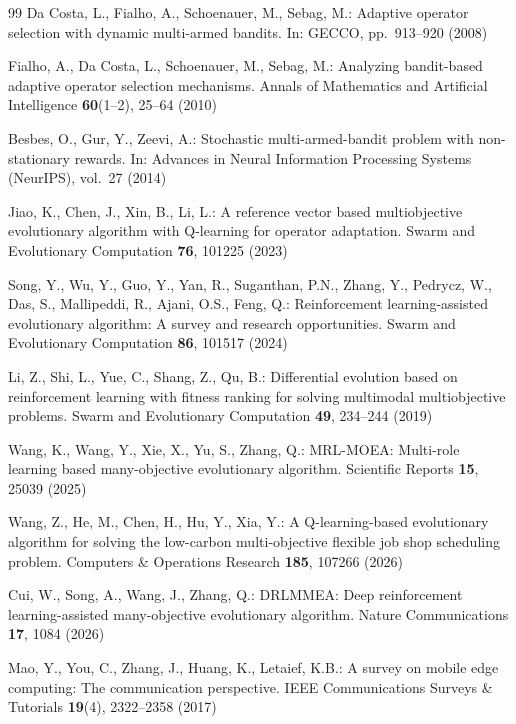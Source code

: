 \documentclass[runningheads]{llncs}
\begin{document}
\begin{thebibliography}{99}
Da Costa, L., Fialho, A., Schoenauer, M., Sebag, M.: Adaptive operator selection with dynamic multi-armed bandits. In: GECCO, pp.~913--920 (2008)

Fialho, A., Da Costa, L., Schoenauer, M., Sebag, M.: Analyzing bandit-based adaptive operator selection mechanisms. Annals of Mathematics and Artificial Intelligence \textbf{60}(1--2), 25--64 (2010)

Besbes, O., Gur, Y., Zeevi, A.: Stochastic multi-armed-bandit problem with non-stationary rewards. In: Advances in Neural Information Processing Systems (NeurIPS), vol.~27 (2014)

Jiao, K., Chen, J., Xin, B., Li, L.: A reference vector based multiobjective evolutionary algorithm with Q-learning for operator adaptation. Swarm and Evolutionary Computation \textbf{76}, 101225 (2023)

Song, Y., Wu, Y., Guo, Y., Yan, R., Suganthan, P.N., Zhang, Y., Pedrycz, W., Das, S., Mallipeddi, R., Ajani, O.S., Feng, Q.: Reinforcement learning-assisted evolutionary algorithm: A survey and research opportunities. Swarm and Evolutionary Computation \textbf{86}, 101517 (2024)

Li, Z., Shi, L., Yue, C., Shang, Z., Qu, B.: Differential evolution based on reinforcement learning with fitness ranking for solving multimodal multiobjective problems. Swarm and Evolutionary Computation \textbf{49}, 234--244 (2019)

Wang, K., Wang, Y., Xie, X., Yu, S., Zhang, Q.: MRL-MOEA: Multi-role learning based many-objective evolutionary algorithm. Scientific Reports \textbf{15}, 25039 (2025)

Wang, Z., He, M., Chen, H., Hu, Y., Xia, Y.: A Q-learning-based evolutionary algorithm for solving the low-carbon multi-objective flexible job shop scheduling problem. Computers \& Operations Research \textbf{185}, 107266 (2026)

Cui, W., Song, A., Wang, J., Zhang, Q.: DRLMMEA: Deep reinforcement learning-assisted many-objective evolutionary algorithm. Nature Communications \textbf{17}, 1084 (2026)

Mao, Y., You, C., Zhang, J., Huang, K., Letaief, K.B.: A survey on mobile edge computing: The communication perspective. IEEE Communications Surveys \& Tutorials \textbf{19}(4), 2322--2358 (2017)


\end{thebibliography}
\end{document}
